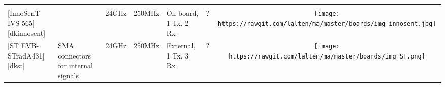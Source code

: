 \begin{longtable}[]{@{}llllllc@{}}
\begin{minipage}[t]{0.10\columnwidth}
\end{minipage}\tabularnewline
\begin{minipage}[t]{0.09\columnwidth}\raggedright\strut
{[}InnoSenT IVS-565{]}{[}dkinnosent{]}\strut
\end{minipage} & \begin{minipage}[t]{0.13\columnwidth}\raggedright\strut
\strut
\end{minipage} & \begin{minipage}[t]{0.09\columnwidth}\raggedright\strut
24GHz\strut
\end{minipage} & \begin{minipage}[t]{0.11\columnwidth}\raggedright\strut
250MHz\strut
\end{minipage} & \begin{minipage}[t]{0.10\columnwidth}\raggedright\strut
On-board, 1 Tx, 2 Rx\strut
\end{minipage} & \begin{minipage}[t]{0.15\columnwidth}\raggedright\strut
?\strut
\end{minipage} & \begin{minipage}[t]{0.10\columnwidth}\centering\strut
\texttt{[image: https://rawgit.com/lalten/ma/master/boards/img\_innosent.jpg]}\strut
\end{minipage}\tabularnewline
\begin{minipage}[t]{0.09\columnwidth}\raggedright\strut
{[}ST EVB-STradA431{]}{[}dkst{]}\strut
\end{minipage} & \begin{minipage}[t]{0.13\columnwidth}\raggedright\strut
SMA connectors for internal signals\strut
\end{minipage} & \begin{minipage}[t]{0.09\columnwidth}\raggedright\strut
24GHz\strut
\end{minipage} & \begin{minipage}[t]{0.11\columnwidth}\raggedright\strut
250MHz\strut
\end{minipage} & \begin{minipage}[t]{0.10\columnwidth}\raggedright\strut
External, 1 Tx, 3 Rx\strut
\end{minipage} & \begin{minipage}[t]{0.15\columnwidth}\raggedright\strut
?\strut
\end{minipage} & \begin{minipage}[t]{0.10\columnwidth}\centering\strut
\texttt{[image: https://rawgit.com/lalten/ma/master/boards/img\_ST.png]}\strut

\end{minipage}
\end{longtable}
